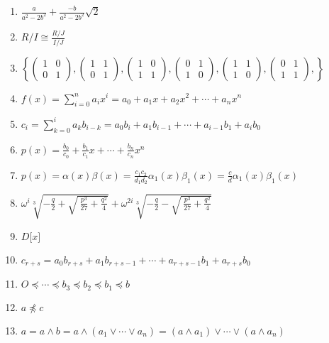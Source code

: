 \documentclass[oneside,10pt,]{article}
\begin{document}
\begin{enumerate}
\item{}\(\displaystyle \frac{a}{a^2 - 2 b^2} +\frac{- b}{ a^2 - 2 b^2} \sqrt{2}\)%
\item{}\(\displaystyle R/I \cong \frac{R/J}{I/J}\)%
\item{}\(\displaystyle \left\{ \begin{pmatrix} 1 & 0 \\ 0 & 1 \end{pmatrix}, \begin{pmatrix} 1 & 1 \\ 0 & 1 \end{pmatrix}, \begin{pmatrix} 1 & 0 \\ 1 & 1 \end{pmatrix}, \begin{pmatrix} 0 & 1 \\ 1 & 0 \end{pmatrix}, \begin{pmatrix} 1 & 1 \\ 1 & 0 \end{pmatrix}, \begin{pmatrix} 0 & 1 \\ 1 & 1 \end{pmatrix}, \right\}\)%
\item{}\(\displaystyle f(x) = \sum^{n}_{i=0} a_i x^i = a_0 + a_1 x +a_2 x^2 + \cdots + a_n x^n\)%
\item{}\(\displaystyle c_i = \sum_{k = 0}^i a_k b_{i - k} = a_0 b_i + a_1 b_{i -1} + \cdots + a_{i -1} b _1 + a_i b_0\)%
\item{}\(\displaystyle p(x) = \frac{b_0}{c_0} + \frac{b_1}{c_1} x + \cdots + \frac{b_n}{c_n} x^n\)%
\item{}\(\displaystyle p(x) = \alpha(x) \beta(x) = \frac{c_1 c_2}{d_1 d_2} \alpha_1(x) \beta_1(x) = \frac{c}{d} \alpha_1(x) \beta_1(x)\)%
\item{}\(\displaystyle \omega^i \sqrt[3]{-\frac{q}{2}+ \sqrt{\ \frac{p^3}{27} + \frac{q^2}{4}} } + \omega^{2i} \sqrt[3]{-\frac{q}{2}- \sqrt{\ \frac{p^3}{27} + \frac{q^2}{4}} }\)%
\item{}\(\displaystyle D\lbrack x \rbrack\)%
\item{}\(\displaystyle c_{r + s} = a_0 b_{r + s} + a_1 b_{r + s - 1} + \cdots + a_{r + s - 1} b_1 + a_{r + s} b_0\)%
\item{}\(\displaystyle O \preceq \cdots \preceq b_3 \preceq b_2 \preceq b_1 \preceq b\)%
\item{}\(\displaystyle a \not\preceq c\)%
\item{}\(\displaystyle a = a \wedge b = a \wedge( a_1 \vee \cdots \vee a_n ) = (a \wedge a_1) \vee \cdots \vee ( a \wedge a_n )\)%

\end{enumerate}
\end{document}
